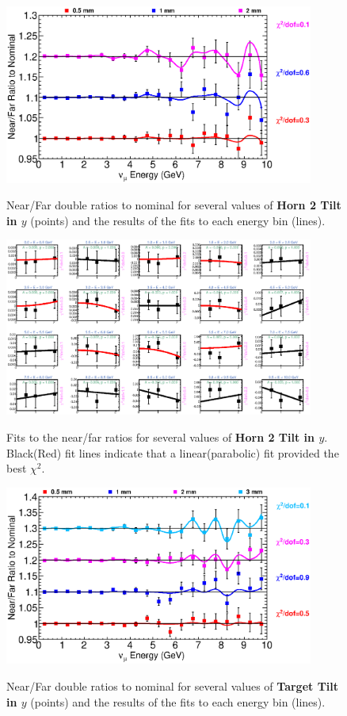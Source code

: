 \begin{figure}[ht]
  \begin{center}
    {\includegraphics[width=4.0in]{figures/Horn2YTilt_nof_summary.eps}}
  \end{center}
\caption{ Near/Far double ratios to nominal for several values of {\bf Horn 2 Tilt in $y$} (points) and the results of the fits to each energy bin (lines).}
\end{figure}

\begin{figure}[hb]
  \begin{center}
    {\includegraphics[width=4.0in]{figures/Horn2YTilt_nof_fits.eps}}
  \end{center}
\caption{ Fits to the near/far ratios for several values of {\bf Horn 2 Tilt in $y$}. Black(Red) fit lines indicate that a linear(parabolic) fit provided the best $\chi^2$. }
\end{figure}

\clearpage

\begin{figure}[ht]
  \begin{center}
    {\includegraphics[width=4.0in]{figures/TargetYTilt_nof_summary.eps}}
  \end{center}
\caption{ Near/Far double ratios to nominal for several values of {\bf Target Tilt in $y$} (points) and the results of the fits to each energy bin (lines).}
\end{figure}

